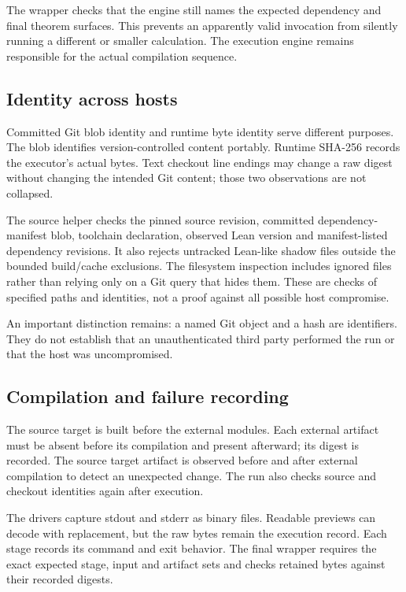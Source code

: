 \documentclass[11pt,a4paper]{article}
\begin{document}
The wrapper checks that the engine still names the expected dependency and final theorem surfaces. This prevents an apparently valid invocation from silently running a different or smaller calculation. The execution engine remains responsible for the actual compilation sequence.

\subsection{Identity across hosts}

Committed Git blob identity and runtime byte identity serve different purposes. The blob identifies version-controlled content portably. Runtime SHA-256 records the executor's actual bytes. Text checkout line endings may change a raw digest without changing the intended Git content; those two observations are not collapsed.

The source helper checks the pinned source revision, committed dependency-manifest blob, toolchain declaration, observed Lean version and manifest-listed dependency revisions. It also rejects untracked Lean-like shadow files outside the bounded build/cache exclusions. The filesystem inspection includes ignored files rather than relying only on a Git query that hides them. These are checks of specified paths and identities, not a proof against all possible host compromise.

An important distinction remains: a named Git object and a hash are identifiers. They do not establish that an unauthenticated third party performed the run or that the host was uncompromised.

\subsection{Compilation and failure recording}

The source target is built before the external modules. Each external artifact must be absent before its compilation and present afterward; its digest is recorded. The source target artifact is observed before and after external compilation to detect an unexpected change. The run also checks source and checkout identities again after execution.

The drivers capture stdout and stderr as binary files. Readable previews can decode with replacement, but the raw bytes remain the execution record. Each stage records its command and exit behavior. The final wrapper requires the exact expected stage, input and artifact sets and checks retained bytes against their recorded digests.
\end{document}
